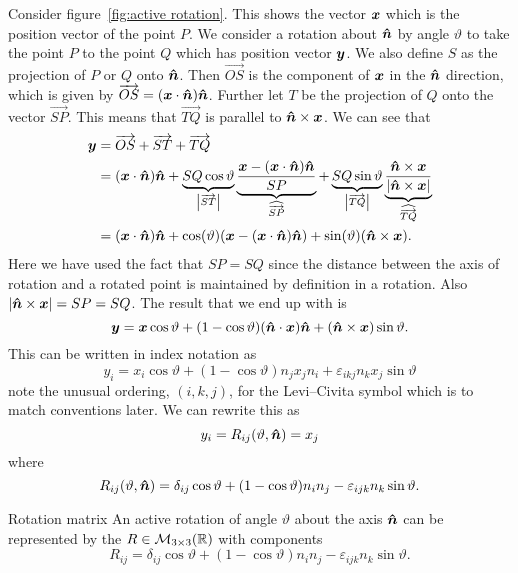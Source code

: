 Consider figure~\ref{fig:active rotation}.
This shows the vector \(\bm{x}\) which is the position vector of the point \(P\).
We consider a rotation about \(\bm{\hat{n}}\) by angle \(\vartheta\) to take the point \(P\) to the point \(Q\) which has position vector \(\bm{y}\).
We also define \(S\) as the projection of \(P\) or \(Q\) onto \(\bm{\hat{n}}\).
Then \(\overrightarrow{OS}\) is the component of \(\bm{x}\) in the \(\bm{\hat{n}}\) direction, which is given by \(\overrightarrow{OS} = (\bm{x}\cdot\bm{\hat{n}})\bm{\hat{n}}\).
Further let \(T\) be the projection of \(Q\) onto the vector \(\overrightarrow{SP}\).
This means that \(\overrightarrow{TQ}\) is parallel to \(\bm{\hat{n}}\times\bm{x}\).
We can see that
\begin{align*}
    \bm{y} &= \overrightarrow{OS} + \overrightarrow{ST} + \overrightarrow{TQ}\\
    &= (\bm{x}\cdot\bm{\hat{n}})\bm{\hat{n}} + \underbrace{SQ\cos\vartheta}_{\abs{\overrightarrow{ST}}} \underbrace{\frac{\bm{x} - (\bm{x}\cdot\bm{\hat{n}})\bm{\hat{n}}}{SP}}_{\widehat{\overrightarrow{SP}}} + \underbrace{SQ\sin\vartheta}_{\abs{\overrightarrow{TQ}}} \underbrace{\frac{\bm{\hat{n}}\times\bm{x}}{\abs{\bm{\hat{n}}\times\bm{x}}}}_{\widehat{\overrightarrow{TQ}}}\\
    &= (\bm{x}\cdot\bm{\hat{n}})\bm{\hat{n}} + \cos(\vartheta)(\bm{x} - (\bm{x}\cdot\bm{\hat{n}})\bm{\hat{n}}) + \sin(\vartheta) (\bm{\hat{n}}\times\bm{x}).
\end{align*}
Here we have used the fact that \(SP = SQ\) since the distance between the axis of rotation and a rotated point is maintained by definition in a rotation.
Also \(\abs{\bm{\hat{n}}\times\bm{x}} = SP = SQ\).
The result that we end up with is
\[\bm{y} = \bm{x} \cos\vartheta + (1 - \cos\vartheta) (\bm{\hat{n}}\cdot\bm{x})\bm{\hat{n}} + (\bm{\hat{n}}\times\bm{x})\sin\vartheta.\]
This can be written in index notation as
\[y_i = x_i\cos\vartheta + (1 - \cos\vartheta) n_jx_jn_i + \varepsilon_{ikj}n_kx_j\sin\vartheta\]
note the unusual ordering, \((i, k, j)\), for the Levi--Civita symbol which is to match conventions later.
We can rewrite this as
\[y_i = R_{ij}(\vartheta, \bm{\hat{n}}) = x_j\]
where 
\[R_{ij}(\vartheta, \bm{\hat{n}}) = \delta_{ij} \cos\vartheta + (1 - \cos\vartheta)n_in_j - \varepsilon_{ijk}n_k\sin\vartheta.\]
\begin{definition}{Rotation matrix}{}
    An active rotation of angle \(\vartheta\) about the axis \(\bm{\hat{n}}\) can be represented by the  \(R\in\mathcal{M}_{{3}\times{3}}({\mathbb{R}})\) with components
    \[R_{ij} = \delta_{ij} \cos\vartheta + (1 - \cos\vartheta)n_in_j - \varepsilon_{ijk}n_k\sin\vartheta.\]
\end{definition}
